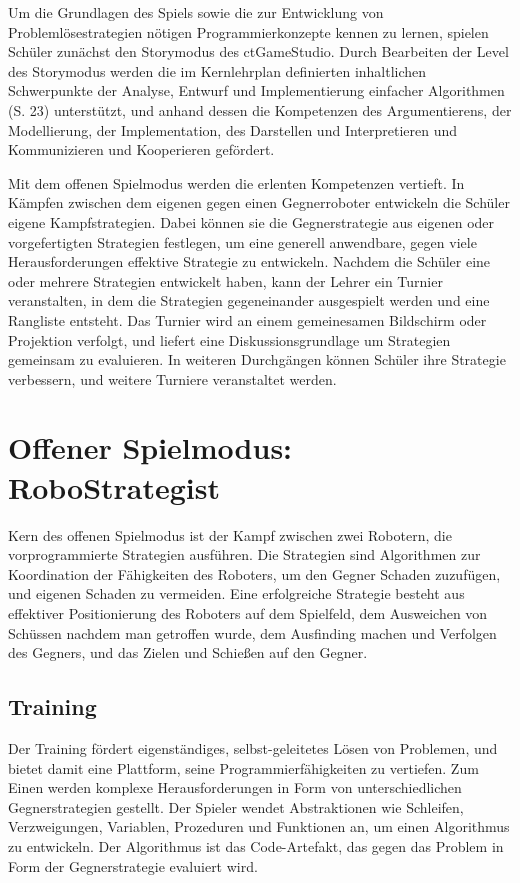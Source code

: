 Um die Grundlagen des Spiels sowie die zur Entwicklung von Problemlösestrategien nötigen
Programmierkonzepte kennen zu lernen, spielen Schüler zunächst den Storymodus des ctGameStudio.
Durch Bearbeiten der Level des Storymodus werden die im Kernlehrplan definierten inhaltlichen
Schwerpunkte der Analyse, Entwurf und Implementierung einfacher Algorithmen (S. 23) unterstützt, und
anhand dessen die Kompetenzen des Argumentierens, der Modellierung, der Implementation, des
Darstellen und Interpretieren und Kommunizieren und Kooperieren gefördert.

Mit dem offenen Spielmodus werden die erlenten Kompetenzen vertieft. In Kämpfen zwischen dem eigenen
gegen einen Gegnerroboter entwickeln die Schüler eigene Kampfstrategien. Dabei können sie die
Gegnerstrategie aus eigenen oder vorgefertigten Strategien festlegen, um eine generell anwendbare,
gegen viele Herausforderungen effektive Strategie zu entwickeln. Nachdem die Schüler eine oder
mehrere Strategien entwickelt haben, kann der Lehrer ein Turnier veranstalten, in dem die Strategien
gegeneinander ausgespielt werden und eine Rangliste entsteht. Das Turnier wird an einem gemeinesamen
Bildschirm oder Projektion verfolgt, und liefert eine Diskussionsgrundlage um Strategien gemeinsam
zu evaluieren. In weiteren Durchgängen können Schüler ihre Strategie verbessern, und weitere
Turniere veranstaltet werden.


\section{Offener Spielmodus: RoboStrategist}

Kern des offenen Spielmodus ist der Kampf zwischen zwei Robotern, die vorprogrammierte Strategien
ausführen. Die Strategien sind Algorithmen zur Koordination der Fähigkeiten des Roboters, um den
Gegner Schaden zuzufügen, und eigenen Schaden zu vermeiden. Eine erfolgreiche Strategie besteht aus
effektiver Positionierung des Roboters auf dem Spielfeld, dem Ausweichen von Schüssen nachdem man
getroffen wurde, dem Ausfinding machen und Verfolgen des Gegners, und das Zielen und Schießen auf
den Gegner.


\subsection{Training}

Der Training fördert eigenständiges, selbst-geleitetes Lösen von Problemen, und bietet damit
eine Plattform, seine Programmierfähigkeiten zu vertiefen. Zum Einen werden komplexe
Herausforderungen in Form von unterschiedlichen Gegnerstrategien gestellt. Der Spieler
wendet Abstraktionen wie Schleifen, Verzweigungen, Variablen, Prozeduren und Funktionen an, um einen
Algorithmus zu entwickeln. Der Algorithmus ist das Code-Artefakt, das gegen das Problem in Form der 
Gegnerstrategie evaluiert wird.

